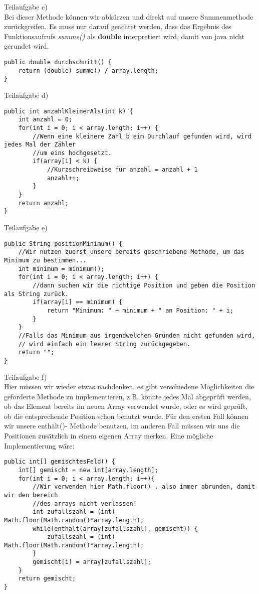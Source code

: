 \documentclass{article}
\begin{document}
Teilaufgabe c) \\
Bei dieser Methode können wir abkürzen und direkt auf unsere Summenmethode zurückgreifen. Es muss nur darauf geachtet werden, dass das Ergebnis des Funktionsaufrufs \textit{summe()} als \textbf{double} interpretiert wird, damit von java nicht gerundet wird.
\begin{verbatim}
public double durchschnitt() {
    return (double) summe() / array.length;
}
\end{verbatim}
Teilaufgabe d) 
\begin{verbatim}
public int anzahlKleinerAls(int k) {
    int anzahl = 0;
    for(int i = 0; i < array.length; i++) {
        //Wenn eine kleinere Zahl b eim Durchlauf gefunden wird, wird jedes Mal der Zähler
        //um eins hochgesetzt. 
        if(array[i] < k) {
            //Kurzschreibweise für anzahl = anzahl + 1
            anzahl++;
        }
    }
    return anzahl;
}
\end{verbatim}
Teilaufgabe e) 
\begin{verbatim}
public String positionMinimum() {
    //Wir nutzen zuerst unsere bereits geschriebene Methode, um das Minimum zu bestimmen...
    int minimum = minimum();
    for(int i = 0; i < array.length; i++) {
        //dann suchen wir die richtige Position und geben die Position als String zurück. 
        if(array[i] == minimum) {
            return "Minimum: " + minimum + " an Position: " + i;
        }
    }
    //Falls das Minimum aus irgendwelchen Gründen nicht gefunden wird,
    // wird einfach ein leerer String zurückgegeben.
    return "";
}
\end{verbatim}
Teilaufgabe f) \\
Hier müssen wir wieder etwas nachdenken, es gibt verschiedene Möglichkeiten die geforderte Methode zu implementieren, z.B. könnte jedes Mal abgeprüft werden, ob das Element bereits im neuen Array verwendet wurde, oder es wird geprüft, ob die entsprechende Position schon benutzt wurde. Für den ersten Fall können wir unsere enthält()- Methode benutzen, im anderen Fall müssen wir uns die Positionen zusätzlich in einem eigenen Array merken. Eine mögliche Implementierung wäre:
\begin{verbatim}
public int[] gemischtesFeld() {
    int[] gemischt = new int[array.length];
    for(int i = 0; i < array.length; i++){
        //Wir verwenden hier Math.floor() . also immer abrunden, damit wir den bereich
        //des arrays nicht verlassen!
        int zufallszahl = (int) Math.floor(Math.random()*array.length);
        while(enthält(array[zufallszahl], gemischt)) {
            zufallszahl = (int) Math.floor(Math.random()*array.length);
        }
        gemischt[i] = array[zufallszahl];
    }
    return gemischt;
}
\end{verbatim}
\end{document}
